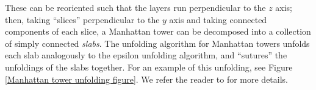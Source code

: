 \documentclass{article}
\begin{document}
These can be reoriented such that the layers run perpendicular to the $z$ axis; then, taking ``slices'' perpendicular to the $y$ axis and taking connected components of each slice, a Manhattan tower can be decomposed into a collection of simply connected \emph{slabs}.
The unfolding algorithm for Manhattan towers unfolds each slab analogously to the epsilon unfolding algorithm, and ``sutures'' the unfoldings of the slabs together.
For an example of this unfolding, see Figure \ref{Manhattan tower unfolding figure}.
We refer the reader to \cite{Damian_Flatland_Orourke_Manhattan} for more details.

\printbibliography
\end{document}
